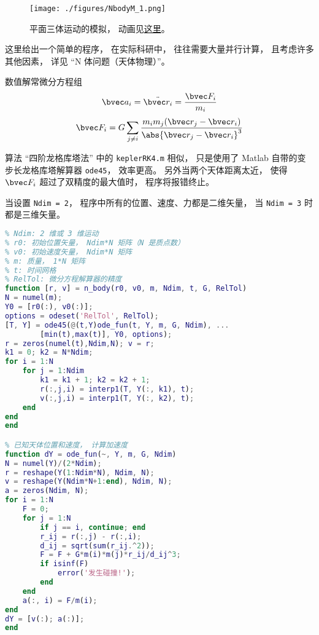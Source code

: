 
\begin{issues}
\issueDraft
\end{issues}


\begin{figure}[ht]
\centering
\texttt{[image: ./figures/NbodyM\_1.png]}
\caption{平面三体运动的模拟， 动画见\href{https://wuli.wiki/apps/3body.html}{这里}。} \label{NbodyM_fig1}
\end{figure}


这里给出一个简单的程序， 在实际科研中， 往往需要大量并行计算， 且考虑许多其他因素， 详见 “N 体问题（天体物理）”。

数值解常微分方程组
\begin{equation}
\bvec a_i = \ddot{\bvec r_i} = \frac{\bvec F_i}{m_i}
\end{equation}
\begin{equation}
\bvec F_i = G\sum_{j\ne i} \frac{m_i m_j(\bvec r_j - \bvec r_i)}{\abs{\bvec r_j - \bvec r_i}^3}
\end{equation}

算法 “四阶龙格库塔法” 中的 \verb|keplerRK4.m| 相似， 只是使用了 Matlab 自带的变步长龙格库塔解算器 \verb|ode45|， 效率更高。 另外当两个天体距离太近， 使得 $\bvec F_i$ 超过了双精度的最大值时， 程序将报错终止。

当设置 \verb|Ndim = 2|， 程序中所有的位置、速度、力都是二维矢量， 当 \verb|Ndim = 3| 时都是三维矢量。


\begin{lstlisting}[language=matlab, caption=n\_body.m]
% N 体问题（支持二维或三维）
% Ndim: 2 维或 3 维运动
% r0: 初始位置矢量， Ndim*N 矩阵（N 是质点数）
% v0: 初始速度矢量， Ndim*N 矩阵
% m: 质量， 1*N 矩阵
% t: 时间网格
% RelTol: 微分方程解算器的精度
function [r, v] = n_body(r0, v0, m, Ndim, t, G, RelTol)
N = numel(m);
Y0 = [r0(:), v0(:)];
options = odeset('RelTol', RelTol);
[T, Y] = ode45(@(t,Y)ode_fun(t, Y, m, G, Ndim), ...
        [min(t),max(t)], Y0, options);
r = zeros(numel(t),Ndim,N); v = r;
k1 = 0; k2 = N*Ndim;
for i = 1:N
    for j = 1:Ndim
        k1 = k1 + 1; k2 = k2 + 1;
        r(:,j,i) = interp1(T, Y(:, k1), t);
        v(:,j,i) = interp1(T, Y(:, k2), t);
    end
end
end

% 已知天体位置和速度， 计算加速度
function dY = ode_fun(~, Y, m, G, Ndim)
N = numel(Y)/(2*Ndim);
r = reshape(Y(1:Ndim*N), Ndim, N);
v = reshape(Y(Ndim*N+1:end), Ndim, N);
a = zeros(Ndim, N);
for i = 1:N
    F = 0;
    for j = 1:N
        if j == i, continue; end
        r_ij = r(:,j) - r(:,i);
        d_ij = sqrt(sum(r_ij.^2));
        F = F + G*m(i)*m(j)*r_ij/d_ij^3;
        if isinf(F)
            error('发生碰撞!');
        end
    end
    a(:, i) = F/m(i);
end
dY = [v(:); a(:)];
end
\end{lstlisting}

